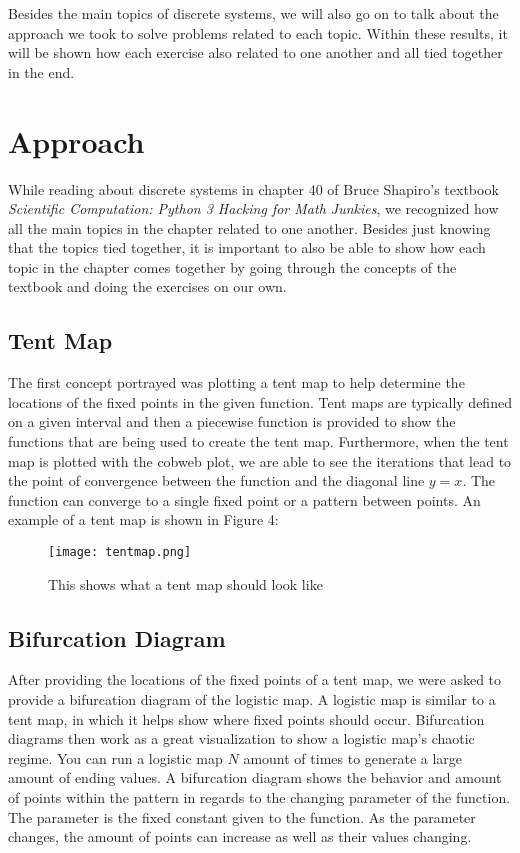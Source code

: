\documentclass{article}
\begin{document}
Besides the main topics of discrete systems, we will also go on to talk about the approach we took to solve problems related to each topic. Within these results, it will be shown how each exercise also related to one another and all tied together in the end. 

\section{Approach}
While reading about discrete systems in chapter 40 of Bruce Shapiro's textbook \emph{Scientific Computation: Python 3 Hacking for Math Junkies}, we recognized how all the main topics in the chapter related to one another. Besides just knowing that the topics tied together, it is important to also be able to show how each topic in the chapter comes together by going through the concepts of the textbook and doing the exercises on our own.

\subsection{Tent Map}
The first concept portrayed was plotting a tent map to help determine the locations of the fixed points in the given function. Tent maps are typically defined on a given interval and then a piecewise function is provided to show the functions that are being used to create the tent map. Furthermore, when the tent map is plotted with the cobweb plot, we are able to see the iterations that lead to the point of convergence between the function and the diagonal line $y=x$. The function can converge to a single fixed point or a pattern between points. An example of a tent map is shown in Figure 4:
\begin{figure}[htp]
    \centering
    \texttt{[image: tentmap.png]}
    \caption{This shows what a tent map should look like}
    \label{fig:Tent Map}
\end{figure}

\subsection{Bifurcation Diagram}
After providing the locations of the fixed points of a tent map, we were asked to provide a bifurcation diagram of the logistic map. A logistic map is similar to a tent map, in which it helps show where fixed points should occur. Bifurcation diagrams then work as a great visualization to show a logistic map's chaotic regime. \cite{weisstein2001logistic} You can run a logistic map $N$ amount of times to generate a large amount of ending values. A bifurcation diagram shows the behavior and amount of points within the pattern in regards to the changing parameter of the function. The parameter is the fixed constant given to the function. As the parameter changes, the amount of points can increase as well as their values changing. \cite{shapiro2018scientific}
\end{document}
